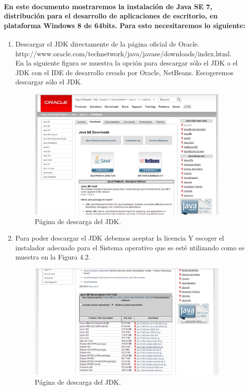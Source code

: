 \documentclass[12pt]{book} %
\begin{document}
\paragraph{En este documento mostraremos la instalación de Java SE 7, distribución para el desarrollo de aplicaciones de escritorio, en plataforma Windows 8 de 64bits. Para esto necesitaremos lo siguiente:}

\begin{enumerate}
\item Descargar el JDK directamente de la página oficial de Oracle. \\http://www.oracle.com/technetwork/java/javase/downloads/index.html.\\
En la siguiente figura se muestra la opción para descargar sólo el JDK o el JDK con el IDE de desarrollo creado por Oracle, NetBeans. Escogeremos descargar sólo el JDK.
	
	\begin{figure}[h!]
		\centering
			\includegraphics[width=10cm]{ins1.jpg}
			\caption{P\'agina de descarga del JDK.}
		
	\end{figure}
	
\item Para poder descargar el JDK debemos aceptar la licencia Y escoger el instalador adecuado para el Sistema operativo que se esté utilizando como se muestra en la Figura 4.2.

	\begin{figure}[h]
		\centering
			\includegraphics[width=10cm]{ins2.jpg}
			\caption{P\'agina de descarga del JDK.}
		

\end{figure}
\end{enumerate}
\end{document}
